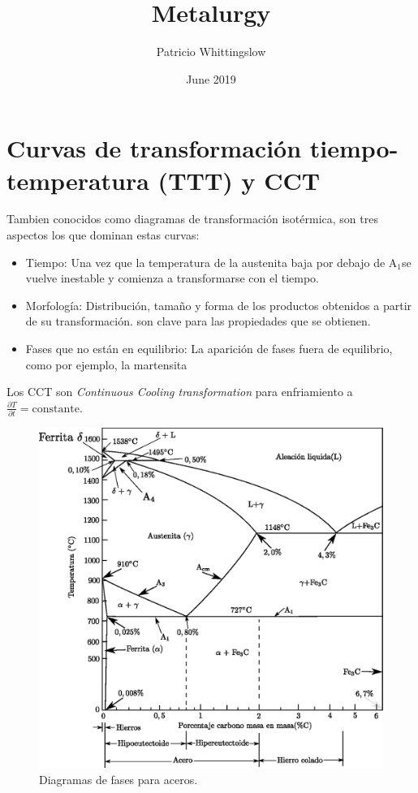 \documentclass{article}
\title{Metalurgy}
\author{Patricio Whittingslow}
\date{June 2019}
\newcommand{\Aone}{A\ensuremath{_{1}}}
\begin{document}
\maketitle

\part{Curvas de transformación tiempo-temperatura (TTT) y CCT}
Tambien conocidos como diagramas de transformación isotérmica, son tres aspectos los que dominan estas curvas:
\begin{itemize}
    \item Tiempo: Una vez que la temperatura de la austenita baja por debajo de \Aone se vuelve inestable y comienza a transformarse con el tiempo. 
    \item Morfología: Distribución, tamaño y forma de los productos obtenidos a partir de su transformación. son clave para las propiedades que se obtienen.
    \item Fases que no están en equilibrio: La aparición de fases fuera de equilibrio, como por ejemplo, la martensita
\end{itemize}
Los CCT son \textit{Continuous Cooling transformation} para enfriamiento a $\frac{\partial T}{\partial t}= \text{constante}$.


\begin{figure}[ht]
    \centering
    \includegraphics[width=1\textwidth]{fig/diagAceroreal.eps}
    \caption{Diagramas de fases para aceros.}
    \label{fig:diagAceros}
\end{figure}
\end{document}
